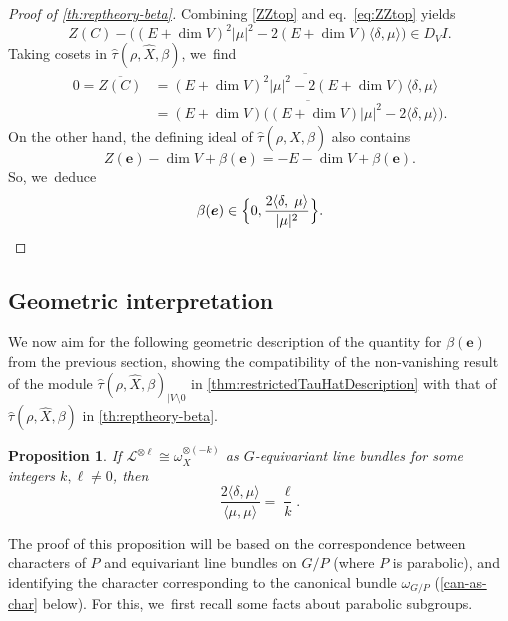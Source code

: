 \documentclass[JEP,XML,SOM,Unicode,published]{cedram}
\newcommand{\bme}{{\boldsymbol{e}}}
\newtheorem{prop}[thm]{Proposition}
\newcommand{\Ell}{\mathscr{L}}
\newcommand\restr[2]{{#1_{| {#2}}}}
\begin{document}
\begin{proof}[Proof of \cref{th:reptheory-beta}]
Combining \cref{ZZtop} and eq.~\eqref{eq:ZZtop} yields\vspace*{-3pt}
\begin{equation*}
Z(C) - \bigl((E+\dim{V})^2|\mu|^2 - 2(E+\dim{V})\langle\delta,\mu\rangle\bigr)\in D_V I.
\end{equation*}
Taking cosets in $\hat\tau(\rho, \hat{X},\beta)$, we~find\vspace*{-3pt}
\begin{align*}
0 = \overline{Z(C)}
&= \overline{(E+\dim{V})^2|\mu|^2 - 2(E+\dim{V})\langle\delta,\mu\rangle}\\
&= \overline{(E+\dim{V})\bigl((E+\dim{V})|\mu|^2 - 2\langle\delta,\mu\rangle\bigr)}.
\end{align*}
On the other hand, the defining ideal of $\hat\tau(\rho, \hat{X},\beta)$ also contains\vspace*{-3pt}
\[
Z(\bme) -\dim{V} + \beta(\bme) = -E - \dim{V} + \beta(\bme).
\]
So, we~deduce\vspace*{-3pt}
\[
\beta(\bme) \in \Bigl\{0, \frac{2\langle\delta,\;\mu\rangle}{|\mu|^2}\Bigr\}.\qedhere
\]
\end{proof}

\subsection{Geometric interpretation}

We now aim for the following geometric description of the quantity for $\beta(\bme)$ from the previous section, showing the compatibility of the non-vanishing result of the module $\restr{\hat{\tau}(\rho,\hat X, \beta)}{V \setminus 0}$ in \cref{thm:restrictedTauHatDescription} with that of
$\hat{\tau}(\rho,\hat{X},\beta)$ in \cref{th:reptheory-beta}.

\begin{prop} \label{prop:repTheoreticDescription}
If $\Ell^{\otimes \ell} \cong \omega_X^{\otimes (-k)}$ as $G$-equivariant line bundles for some integers $k, \ell \neq 0$, then\vspace*{-3pt}
\[
\frac{2\langle \delta, \mu \rangle}{\langle \mu, \mu \rangle} = \frac{\ell}{k}.
\]
\end{prop}

The proof of this proposition will be based on the correspondence between characters of $P$ and equivariant line bundles on $G/P$ (where $P$ is parabolic), and identifying the character corresponding to the canonical bundle $\omega_{G/P}$ (\cref{can-as-char} below). For this, we~first recall some facts about parabolic subgroups.
\end{document}
